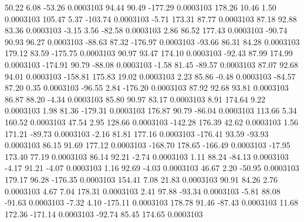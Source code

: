        50.22        6.08      -53.26     0.0003103
       94.44       90.49     -177.29     0.0003103
      178.26       10.46        1.50     0.0003103
      105.47        5.37     -103.74     0.0003103
       -5.71      173.31       87.77     0.0003103
       87.18       92.88       83.36     0.0003103
       -3.15        3.56      -82.58     0.0003103
        2.86       86.52      177.43     0.0003103
      -90.74       90.93       96.27     0.0003103
      -88.63       87.32     -176.97     0.0003103
      -93.66       86.31       84.28     0.0003103
      179.12       83.59     -175.75     0.0003103
       90.97       93.47      174.10     0.0003103
      -92.43       87.99      174.99     0.0003103
     -174.91       90.79      -88.08     0.0003103
       -1.58       81.45      -89.57     0.0003103
       87.07       92.68       94.01     0.0003103
     -158.81      175.83       19.02     0.0003103
        2.23       85.86       -0.48     0.0003103
      -84.57       87.20        0.35     0.0003103
      -96.55        2.84     -176.20     0.0003103
       87.92       92.68       93.81     0.0003103
       86.87       88.20       -4.34     0.0003103
       85.80       90.97       83.17     0.0003103
        8.91      174.64        9.22     0.0003103
        1.98       81.36     -179.31     0.0003103
      176.87       90.79      -86.04     0.0003103
      113.66        5.34      160.52     0.0003103
       47.54        2.95      128.66     0.0003103
     -142.28      176.39       42.62     0.0003103
        1.56      171.21      -89.73     0.0003103
       -2.16       81.81      177.16     0.0003103
     -176.41       93.59      -93.93     0.0003103
       86.15       91.69      177.12     0.0003103
     -168.70      178.65     -166.49     0.0003103
      -17.95      173.40       77.19     0.0003103
       86.14       92.21       -2.74     0.0003103
        1.11       88.24      -84.13     0.0003103
       -4.17       91.21       -4.07     0.0003103
        1.16       92.69       -4.03     0.0003103
       46.67        2.20      -50.95     0.0003103
      179.17       96.28     -176.35     0.0003103
      154.41        7.08       21.83     0.0003103
       90.91       84.26        2.76     0.0003103
        4.67        7.04      178.31     0.0003103
        2.41       97.88      -93.34     0.0003103
       -5.81       88.08      -91.63     0.0003103
       -7.32        4.10     -175.11     0.0003103
      178.78       91.46      -87.43     0.0003103
       11.68      172.36     -171.14     0.0003103
      -92.74       85.45      174.65     0.0003103
